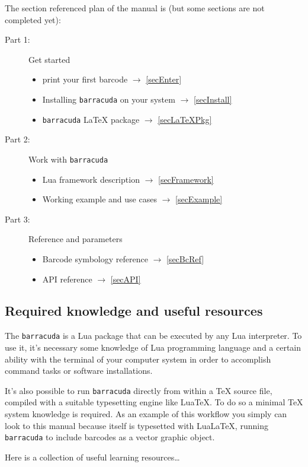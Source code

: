 \documentclass{article}
\newcommand{\code}[1]{\texttt{#1}}
\newcommand{\brcd}{\code{barracuda}}
\begin{document}
The section referenced plan of the manual is (but some sections are not completed yet):
\begin{description}
\item[Part 1:] Get started
\begin{itemize}
	\item print your first barcode \( \to \) \ref{secEnter}
	\item Installing \brcd{} on your system \( \to \) \ref{secInstall}
	\item \brcd{} \LaTeX{} package \( \to \) \ref{secLaTeXPkg}
\end{itemize}
\item[Part 2:] Work with \brcd{}
\begin{itemize}
	\item Lua framework description \( \to \) \ref{secFramework}
	\item Working example and use cases \( \to \) \ref{secExample}
\end{itemize}
\item[Part 3:] Reference and parameters
\begin{itemize}
	\item Barcode symbology reference \( \to \) \ref{secBcRef}
	\item API reference \( \to \) \ref{secAPI}
\end{itemize}
\end{description}

\subsection{Required knowledge and useful resources}

The \brcd{} is a Lua package that can be executed by any Lua interpreter. To use
it, it's necessary some knowledge of Lua programming language and a certain
ability with the terminal of your computer system in order to accomplish command
tasks or software installations.

It's also possible to run \brcd{} directly from within a \TeX{} source file,
compiled with a suitable typesetting engine like Lua\TeX{}. To do so a minimal
\TeX{} system knowledge is required. As an example of this workflow you simply
can look to this manual because itself is typesetted with LuaLa\TeX{}, running
\brcd{} to include barcodes as a vector graphic object.

Here is a collection of useful learning resources\dots

%
%
%
%
\end{document}
